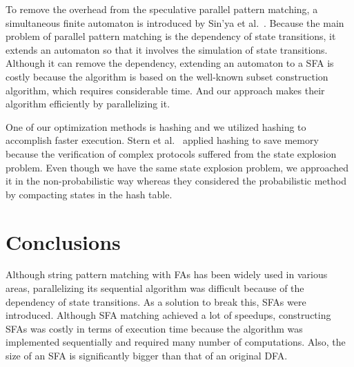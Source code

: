 \documentclass[10pt, conference, compsocconf]{IEEEtran}
\begin{document}
To remove the overhead from the speculative parallel pattern
matching, a simultaneous finite automaton is introduced
by Sin'ya et al.~\cite{Sinya2013}. Because the main problem of parallel
pattern matching is the dependency of state transitions, it extends
an automaton so that it involves the simulation of state transitions.
Although it can remove the dependency, extending an automaton to a
SFA is costly because the algorithm is based on the well-known subset
construction algorithm, which requires considerable time.
And our approach makes their algorithm efficiently by parallelizing it.

One of our optimization methods is hashing and we utilized hashing to accomplish faster 
execution. Stern et al.~\cite{Stern95improvedprobabilistic} applied hashing to save memory
because the verification of complex protocols suffered from the state explosion problem.
Even though we have the same state explosion problem, we approached it in the non-probabilistic
way whereas they considered the probabilistic method by compacting states in the hash table.
                                                
\section{Conclusions}
\label{sec:conclusions}
Although string pattern matching with FAs has been widely used in various
areas, parallelizing its sequential algorithm was difficult because of the 
dependency of state transitions. As a solution to break this, SFAs
were introduced. Although SFA matching achieved 
a lot of speedups, constructing SFAs was costly in terms of  
execution time because the algorithm was implemented sequentially and 
required many number of computations.
Also, the size of an SFA is significantly bigger than that of an original DFA.
\end{document}
